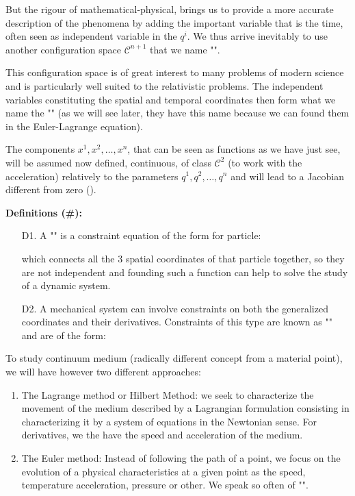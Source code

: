 	 But the rigour of mathematical-physical, brings us to provide a more accurate description of the phenomena by adding the important variable that is the time, often seen as independent variable in the $q^i$. We thus arrive inevitably to use another configuration space $\mathcal{C}^{n+1}$ that we name "".
	 
	 This configuration space is of great interest to many problems of modern science and is particularly well suited to the relativistic problems. The independent variables constituting the spatial and temporal coordinates then form what we name the "" (as we will see later, they have this name because we can found them in the Euler-Lagrange equation).
	 
	 The components $x^1,x^2,\ldots,x^n$, that can be seen as functions as we have just see, will be assumed now defined, continuous, of class $\mathcal{C}^2$ (to work with the acceleration) relatively to the parameters $q^1,q^2, \ldots, q^n$ and will lead to a Jacobian different from zero ().
	 
	\textbf{Definitions (\#\mydef):}
	\begin{enumerate}
		\item[D1.] A "" is a constraint equation of the form for particle:
		
		which connects all the 3 spatial coordinates of that particle together, so they are not independent and founding such a function can help to solve the study of a dynamic system.
		
		\item[D2.] A mechanical system can involve constraints on both the generalized coordinates and their derivatives. Constraints of this type are known as "" and are of the form:
		
	\end{enumerate}
	To study continuum medium (radically different concept from a material point), we will have however two different approaches:
	\begin{enumerate}
		\item The Lagrange method or Hilbert Method: we seek to characterize the movement of the medium described by a Lagrangian formulation consisting in characterizing it by a system of equations in the Newtonian sense. For derivatives, we the have the speed and acceleration of the medium.

		\item The Euler method: Instead of following the path of a point, we focus on the evolution of a physical characteristics at a given point as the speed, temperature acceleration, pressure or other. We speak so often of "".
	\end{enumerate}
	
